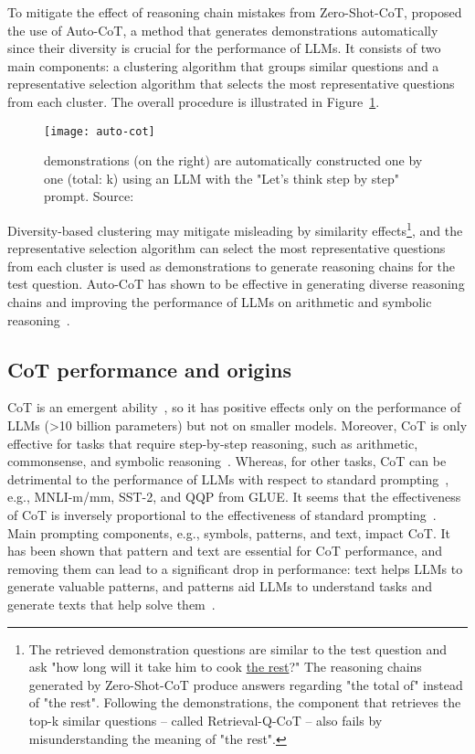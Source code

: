 To mitigate the effect of reasoning chain mistakes from Zero-Shot-CoT, \textcite{zhang2022automatic} proposed the use of Auto-CoT, a method that generates demonstrations automatically since their diversity is crucial for the performance of LLMs.
It consists of two main components: a clustering algorithm that groups similar questions and a representative selection algorithm that selects the most representative questions from each cluster.
The overall procedure is illustrated in Figure~\ref{fig:auto-cot}.
\begin{figure}[h!]
	\centering
	\texttt{[image: auto-cot]}
	\caption{demonstrations (on the right) are automatically constructed one by one (total: k) using an LLM with the "Let’s think step by step" prompt. Source: \textcite{zhang2022automatic}}
	\label{fig:auto-cot}
\end{figure}
Diversity-based clustering may mitigate misleading by similarity effects\footnote{The retrieved demonstration questions are similar to the test question and ask "how long will it take him to cook \underline{the rest}?" The reasoning chains generated by Zero-Shot-CoT produce answers regarding "the total of" instead of "the rest". Following the demonstrations, the component that retrieves the top-k similar questions -- called Retrieval-Q-CoT -- also fails by misunderstanding the meaning of "the rest".}, and the representative selection algorithm can select the most representative questions from each cluster is used as demonstrations to generate reasoning chains for the test question.
Auto-CoT has shown to be effective in generating diverse reasoning chains and improving the performance of LLMs on arithmetic and symbolic reasoning~\cite{zhang2022automatic}.

\subsection{CoT performance and origins}
\label{subsec:cot-performance}

CoT is an emergent ability~\cite{wei2022emergent}, so it has positive effects only on the performance of LLMs (\textgreater 10 billion parameters) but not on smaller models.
Moreover, CoT is only effective for tasks that require step-by-step reasoning, such as arithmetic, commonsense, and symbolic reasoning~\cite{wei2022chain, miao2021diverse, talmor2019commonsenseqa}.
Whereas, for other tasks, CoT can be detrimental to the performance of LLMs with respect to standard prompting~\cite{wang2022rationale}, e.g., MNLI-m/mm, SST-2, and QQP from GLUE\cite{wang2018glue}.
It seems that the effectiveness of CoT is inversely proportional to the effectiveness of standard prompting~\cite{wei2022chain}.
Main prompting components, e.g., symbols, patterns, and text, impact CoT.
It has been shown that pattern and text are essential for CoT performance, and removing them can lead to a significant drop in performance: text helps LLMs
to generate valuable patterns, and patterns aid LLMs to understand tasks and generate texts that help solve them~\cite{madaan2022text}.

